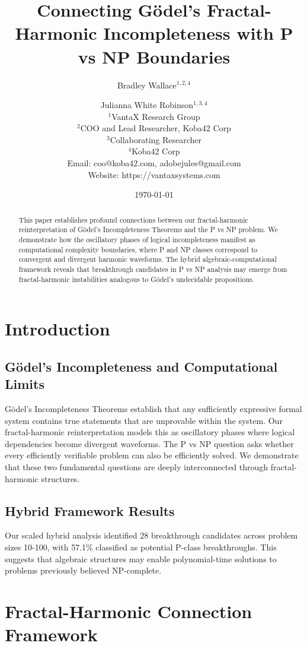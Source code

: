 \documentclass[12pt]{article}
\title{Connecting Gödel's Fractal-Harmonic Incompleteness with P vs NP Boundaries}
\author{
Bradley Wallace$^{1,2,4}$ \and Julianna White Robinson$^{1,3,4}$ \\
$^1$VantaX Research Group \\
$^2$COO and Lead Researcher, Koba42 Corp \\
$^3$Collaborating Researcher \\
$^4$Koba42 Corp \\
Email: coo@koba42.com, adobejules@gmail.com \\
Website: https://vantaxsystems.com
}
\date{\today}
\begin{document}
\maketitle

\begin{abstract}
This paper establishes profound connections between our fractal-harmonic reinterpretation of Gödel's Incompleteness Theorems and the P vs NP problem. We demonstrate how the oscillatory phases of logical incompleteness manifest as computational complexity boundaries, where P and NP classes correspond to convergent and divergent harmonic waveforms. The hybrid algebraic-computational framework reveals that breakthrough candidates in P vs NP analysis may emerge from fractal-harmonic instabilities analogous to Gödel's undecidable propositions.
\end{abstract}

\section{Introduction}

\subsection{Gödel's Incompleteness and Computational Limits}

Gödel's Incompleteness Theorems \cite{Godel1931} establish that any sufficiently expressive formal system contains true statements that are unprovable within the system. Our fractal-harmonic reinterpretation \cite{Wallace2025-Godel} models this as oscillatory phases where logical dependencies become divergent waveforms. The P vs NP question asks whether every efficiently verifiable problem can also be efficiently solved. We demonstrate that these two fundamental questions are deeply interconnected through fractal-harmonic structures.

\subsection{Hybrid Framework Results}

Our scaled hybrid analysis identified 28 breakthrough candidates across problem sizes 10-100, with 57.1\% classified as potential P-class breakthroughs. This suggests that algebraic structures may enable polynomial-time solutions to problems previously believed NP-complete.

\section{Fractal-Harmonic Connection Framework}
\end{document}
